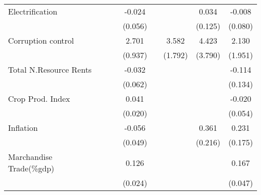 \begin{table}[H]
\begin{adjustbox}{max width=\textwidth}
\begin{tabular}{l*{7}{c}}
\addlinespace
Electrification&                     &                     &      -0.024         &                     &                     &       0.034         &      -0.008         \\
            &                     &                     &     (0.056)         &                     &                     &     (0.125)         &     (0.080)         \\
\addlinespace
Corruption control&                     &                     &       2.701\sym{***}&                     &       3.582\sym{**} &       4.423         &       2.130         \\
            &                     &                     &     (0.937)         &                     &     (1.792)         &     (3.790)         &     (1.951)         \\
\addlinespace
Total N.Resource Rents&                     &                     &      -0.032         &                     &                     &                     &      -0.114         \\
            &                     &                     &     (0.062)         &                     &                     &                     &     (0.134)         \\
\addlinespace
Crop Prod. Index&                     &                     &       0.041\sym{**} &                     &                     &                     &      -0.020         \\
            &                     &                     &     (0.020)         &                     &                     &                     &     (0.054)         \\
\addlinespace
Inflation   &                     &                     &      -0.056         &                     &                     &       0.361\sym{*}  &       0.231         \\
            &                     &                     &     (0.049)         &                     &                     &     (0.216)         &     (0.175)         \\
\addlinespace
Marchandise Trade(\%gdp)&                     &                     &       0.126\sym{***}&                     &                     &                     &       0.167\sym{***}\\
            &                     &                     &     (0.024)         &                     &                     &                     &     (0.047)         \\

\end{tabular}
\end{adjustbox}
\end{table}
